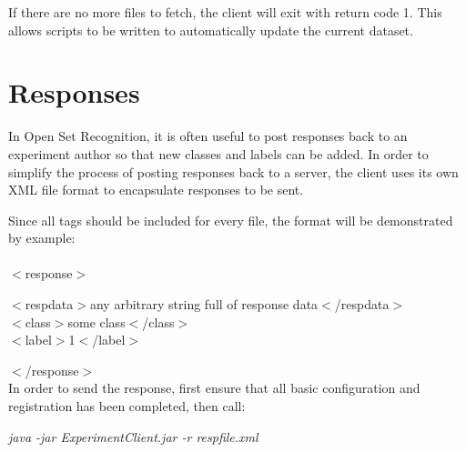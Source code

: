 \documentclass[letterpaper]{article}
\begin{document}
If there are no more files to fetch, the client will exit with return code 1. This allows scripts to be written to automatically update the current dataset.

\section{Responses}
In Open Set Recognition, it is often useful to post responses back to an experiment author so that new classes and labels can be added. In order to simplify the process of posting responses back to a server, the client uses its own XML file format to encapsulate responses to be sent.

Since all tags should be included for every file, the format will be demonstrated by example:\\
\\
$<$response$>$
\begin{addmargin}[1em]{2em}
      $<$respdata$>$any arbitrary string full of response data$<$/respdata$>$\\
      $<$class$>$some class$<$/class$>$\\
      $<$label$>$1$<$/label$>$
\end{addmargin}
$<$/response$>$\\

In order to send the response, first ensure that all basic configuration and registration has been completed, then call:
\begin{addmargin}[1em]{2em}
   \textit{java -jar ExperimentClient.jar -r respfile.xml}
\end{addmargin}
\end{document}
